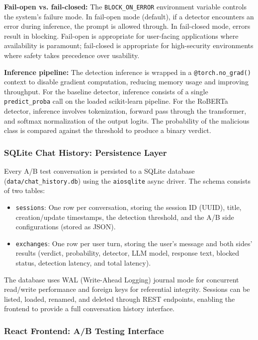 \documentclass[12pt, letterpaper]{article}   %
\begin{document}
\textbf{Fail-open vs. fail-closed:} The \texttt{BLOCK\_ON\_ERROR} environment variable controls the system's failure mode. In fail-open mode (default), if a detector encounters an error during inference, the prompt is allowed through. In fail-closed mode, errors result in blocking. Fail-open is appropriate for user-facing applications where availability is paramount; fail-closed is appropriate for high-security environments where safety takes precedence over usability.

\textbf{Inference pipeline:} The detection inference is wrapped in a \texttt{@torch.no\_grad()} context to disable gradient computation, reducing memory usage and improving throughput. For the baseline detector, inference consists of a single \texttt{predict\_proba} call on the loaded scikit-learn pipeline. For the RoBERTa detector, inference involves tokenization, forward pass through the transformer, and softmax normalization of the output logits. The probability of the malicious class is compared against the threshold to produce a binary verdict.

\subsubsection{SQLite Chat History: Persistence Layer}

Every A/B test conversation is persisted to a SQLite database (\texttt{data/chat\_history.db}) using the \texttt{aiosqlite} async driver. The schema consists of two tables:

\begin{itemize}
    \item \texttt{sessions}: One row per conversation, storing the session ID (UUID), title, creation/update timestamps, the detection threshold, and the A/B side configurations (stored as JSON).
    \item \texttt{exchanges}: One row per user turn, storing the user's message and both sides' results (verdict, probability, detector, LLM model, response text, blocked status, detection latency, and total latency).
\end{itemize}

The database uses WAL (Write-Ahead Logging) journal mode for concurrent read/write performance and foreign keys for referential integrity. Sessions can be listed, loaded, renamed, and deleted through REST endpoints, enabling the frontend to provide a full conversation history interface.

\subsubsection{React Frontend: A/B Testing Interface}
\end{document}
